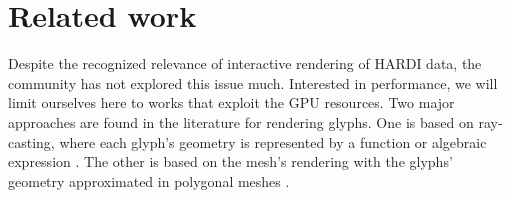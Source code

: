 \documentclass[twoside,twocolumn,10pt]{article}
\begin{document}


\section{Related work}
\label{sec::related_work}



 Despite the recognized relevance of interactive rendering of HARDI data, the community has not explored this issue much. Interested in performance, we will limit ourselves here to works that exploit the GPU resources. Two major approaches are found in the literature for rendering glyphs. One is based on ray-casting, where each glyph's geometry is represented by a function or algebraic expression \cite{peeters2009, almsick2011}. The other is based on the mesh's rendering with the glyphs' geometry approximated in polygonal meshes \cite{shattuck2008}.
 
 
\end{document}
